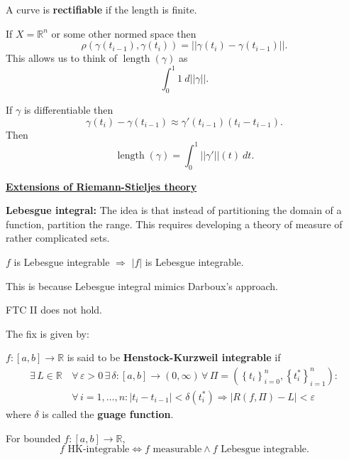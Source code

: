 \documentclass{notes}
\begin{document}
\begin{rmk}
\begin{itemize}
      A curve is {\boldmath \bfseries rectifiable} if the length is finite.
      
      If $X = \mathbb R^n$ or some other normed space then 
      \[
        \rho(\gamma(t_{i - 1}), \gamma(t_i)) = || \gamma(t_i) - \gamma(t_{i - 1}) ||.
      \]
      This allows us to think of $\operatorname{length}(\gamma)$ as 
      \[
        \int_0^1 1\ d||\gamma||.
      \]
      
      If $\gamma$ is differentiable then 
      \[
        \gamma(t_i) - \gamma(t_{i - 1}) \approx \gamma'(t_{i - 1}) (t_i - t_{i - 1}).
      \]
      Then 
      \[
        \operatorname{length}(\gamma) = \int_0^1 || \gamma' ||(t)\ dt.
      \]
    \end{itemize}
  \end{rmk}
  
  {\boldmath \bfseries \underline{Extensions of Riemann-Stieljes theory}}
  
  {\boldmath \bfseries Lebesgue integral:} The idea is that instead of partitioning the domain of a function, partition the range.
  This requires developing a theory of measure of rather complicated sets.
  
  \begin{note}
    $f$ is Lebesgue integrable $\Rightarrow$ $\left | f \right |$ is Lebesgue integrable.
  \end{note}
  
  This is because Lebesgue integral mimics Darboux's approach.

  FTC II does not hold.

  The fix is given by: 
  \begin{defn}
    $f \colon [a, b] \to \mathbb R$ is said to be {\boldmath \bfseries Henstock-Kurzweil integrable} if 
    \begin{align*}
      \exists \, L \in \mathbb R \, &\forall \, \varepsilon > 0 \, \exists \, \delta \colon [a, b] \to (0, \infty) \, \forall \, \Pi = (\left \{ t_i \right \}_{i = 0}^n, \left \{ t^*_i \right \}_{i = 1}^n): \\ 
      &\forall \, i = 1, \dots, n: \left | t_i - t_{i - 1} \right | < \delta(t^*_i) \Rightarrow \left | R(f, \Pi) - L \right | < \varepsilon
    \end{align*}
    where $\delta$ is called the {\boldmath \bfseries guage function}.
  \end{defn}
  
  For bounded $f \colon [a, b] \to \mathbb R$, 
  \[
    f \text{ HK-integrable} \Leftrightarrow f \text{ measurable} \land f \text{ Lebesgue integrable}.
  \]
  
\end{document}
